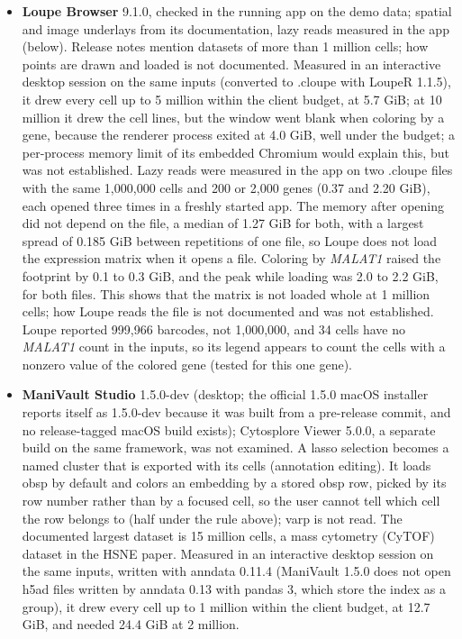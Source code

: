 \documentclass[11pt]{article}
\begin{document}
\begin{itemize}[nosep]
\item \textbf{Loupe Browser} 9.1.0, checked in the running app on the demo data; spatial and image underlays from its documentation, lazy reads measured in the app (below). Release notes mention datasets of more than 1 million cells; how points are drawn and loaded is not documented. Measured in an interactive desktop session on the same inputs (converted to .cloupe with LoupeR 1.1.5), it drew every cell up to 5 million within the client budget, at 5.7 GiB; at 10 million it drew the cell lines, but the window went blank when coloring by a gene, because the renderer process exited at 4.0 GiB, well under the budget; a per-process memory limit of its embedded Chromium would explain this, but was not established. Lazy reads were measured in the app on two .cloupe files with the same 1,000,000 cells and 200 or 2,000 genes (0.37 and 2.20 GiB), each opened three times in a freshly started app. The memory after opening did not depend on the file, a median of 1.27 GiB for both, with a largest spread of 0.185 GiB between repetitions of one file, so Loupe does not load the expression matrix when it opens a file. Coloring by \textit{MALAT1} raised the footprint by 0.1 to 0.3 GiB, and the peak while loading was 2.0 to 2.2 GiB, for both files. This shows that the matrix is not loaded whole at 1 million cells; how Loupe reads the file is not documented and was not established. Loupe reported 999,966 barcodes, not 1,000,000, and 34 cells have no \textit{MALAT1} count in the inputs, so its legend appears to count the cells with a nonzero value of the colored gene (tested for this one gene).
\item \textbf{ManiVault Studio} 1.5.0-dev (desktop; the official 1.5.0 macOS installer reports itself as 1.5.0-dev because it was built from a pre-release commit, and no release-tagged macOS build exists); Cytosplore Viewer 5.0.0, a separate build on the same framework, was not examined. A lasso selection becomes a named cluster that is exported with its cells (annotation editing). It loads obsp by default and colors an embedding by a stored obsp row, picked by its row number rather than by a focused cell, so the user cannot tell which cell the row belongs to (half under the rule above); varp is not read. The documented largest dataset is 15 million cells, a mass cytometry (CyTOF) dataset in the HSNE paper\cite{vanunen2017hsne}. Measured in an interactive desktop session on the same inputs, written with anndata 0.11.4 (ManiVault 1.5.0 does not open h5ad files written by anndata 0.13 with pandas 3, which store the index as a group), it drew every cell up to 1 million within the client budget, at 12.7 GiB, and needed 24.4 GiB at 2 million.

\end{itemize}
\end{document}
